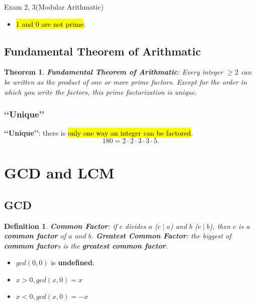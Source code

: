 \documentclass{note}
\newtheorem{definition}{Definition}
\newtheorem{theorem}{Theorem}
\begin{document}
\begin{note}{Exam 2, 3(Modular Arithmatic)}
        \begin{itemize}
            \item \hl{$ 1 $ and $ 0 $ are not prime};
        \end{itemize}

        \subsection{Fundamental Theorem of Arithmatic}

        \begin{theorem}
            \textbf{Fundamental Theorem of Arithmatic}: Every integer $ \geq 2 $ can be written as the 
            product of one or more prime factors. Except for the order in which you write the factors, 
            this prime factorization is unique.
        \end{theorem}

        \subsubsection{\lq\lq Unique\rq\rq}
        \textbf{\lq\lq Unique\rq\rq}: there is \hl{only one way an integer can be factored}.
        \begin{displaymath}
            180 = 2 \cdot 2 \cdot 3 \cdot 3 \cdot 5.
        \end{displaymath}

        \section{GCD and LCM}

        \subsection{GCD}

        \begin{definition}
            \textbf{Common Factor}: if $ c $ divides $ a $ ($ c \mid a $) and $ b $ ($ c \mid b $), 
            then $ c $ is a \textbf{common factor} of $ a $ and $ b $. \textbf{Greatest Common Factor}: 
            the biggest of \textbf{common factor}s is the \textbf{greatest common factor}.
        \end{definition}

        \begin{itemize}
            \item $ gcd \left( 0,0 \right) $ is \textbf{undefined};
            \item $ x > 0, gcd \left( x, 0 \right) = x $
            \item $ x < 0, gcd \left( x, 0 \right) = -x $
        \end{itemize}


\end{note}
\end{document}
